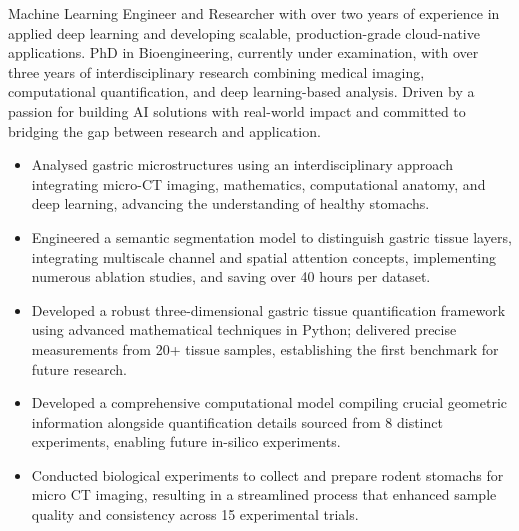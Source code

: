 \documentclass[12pt,a4paper,withhyper]{altacv}
\begin{document}


\makecvheader{}

\medskip


Machine Learning Engineer and Researcher with over two years of experience in applied deep learning and developing scalable, production-grade cloud-native applications. PhD in Bioengineering, currently under examination, with over three years of interdisciplinary research combining medical imaging, computational quantification, and deep learning-based analysis. Driven by a passion for building AI solutions with real-world impact and committed to bridging the gap between research and application.

\medskip


\begin{itemize}
    \item Analysed gastric microstructures using an interdisciplinary approach integrating micro-CT imaging, mathematics, computational anatomy, and deep learning, advancing the understanding of healthy stomachs.
    \item Engineered a semantic segmentation model to distinguish gastric tissue layers, integrating multiscale channel and spatial attention concepts, implementing numerous ablation studies, and saving over 40 hours per dataset.
    \item Developed a robust three-dimensional gastric tissue quantification framework using advanced mathematical techniques in Python; delivered precise measurements from 20+ tissue samples, establishing the first benchmark for future research.
    \item Developed a comprehensive computational model compiling crucial geometric information alongside quantification details sourced from 8 distinct experiments, enabling future in-silico experiments.
    \item Conducted biological experiments to collect and prepare rodent stomachs for micro CT imaging, resulting in a streamlined process that enhanced sample quality and consistency across 15 experimental trials.
\end{itemize}
\end{document}
